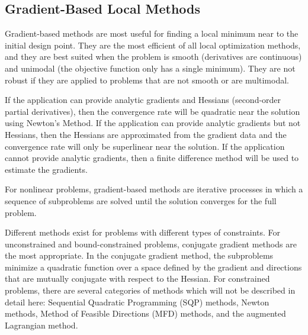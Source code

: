\subsection{Gradient-Based Local Methods}
\label{sec:bg:opt:grad}

Gradient-based methods are most useful for finding a local minimum near to the initial design point.
They are the most efficient of all local optimization methods, and they are best suited when the problem is smooth (derivatives are continuous) and unimodal (the objective function only has a single minimum).
They are not robust if they are applied to problems that are not smooth or are multimodal.

If the application can provide analytic gradients and Hessians (second-order partial derivatives), then the convergence rate will be quadratic near the solution using Newton's Method.
If the application can provide analytic gradients but not Hessians, then the Hessians are approximated from the gradient data and the convergence rate will only be superlinear near the solution.
If the application cannot provide analytic gradients, then a finite difference method will be used to estimate the gradients.

For nonlinear problems, gradient-based methods are iterative processes in which a sequence of subproblems are solved until the solution converges for the full problem.

Different methods exist for problems with different types of constraints.
For unconstrained and bound-constrained problems, conjugate gradient methods are the most appropriate.
In the conjugate gradient method, the subproblems minimize a quadratic function over a space defined by the gradient and directions that are mutually conjugate with respect to the Hessian.
For constrained problems, there are several categories of methods which will not be described in detail here: Sequential Quadratic Programming (SQP) methods, Newton methods, Method of Feasible Directions (MFD) methods, and the augmented Lagrangian method.

